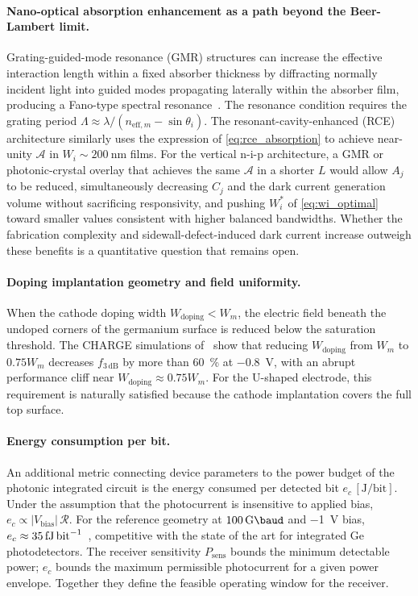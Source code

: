 \paragraph{Nano-optical absorption enhancement as a path beyond the Beer-Lambert limit.}
Grating-guided-mode resonance (GMR) structures can increase the effective
interaction length within a fixed absorber thickness by diffracting normally
incident light into guided modes propagating laterally within the absorber film,
producing a Fano-type spectral resonance~\cite{Yan2024}. The resonance condition
requires the grating period $\Lambda\approx\lambda/(n_{\mathrm{eff},m}-\sin\theta_i)$.
The resonant-cavity-enhanced (RCE) architecture similarly uses the expression of
\cref{eq:rce_absorption} to achieve near-unity $\mathcal{A}$ in
$W_i\sim\SI{200}{\nano\metre}$ films. For the vertical n-i-p architecture, a
GMR or photonic-crystal overlay that achieves the same $\mathcal{A}$ in a shorter
$L$ would allow $A_j$ to be reduced, simultaneously decreasing $C_j$ and the
dark current generation volume without sacrificing responsivity, and pushing
$W_i^*$ of \cref{eq:wi_optimal} toward smaller values consistent with higher
balanced bandwidths. Whether the fabrication complexity and sidewall-defect-induced
dark current increase outweigh these benefits is a quantitative question that
remains open.

\paragraph{Doping implantation geometry and field uniformity.}
When the cathode doping width $W_{\mathrm{doping}}<W_m$, the electric field
beneath the undoped corners of the germanium surface is reduced below the
saturation threshold. The CHARGE simulations of~\cite{Alasio2024} show that
reducing $W_{\mathrm{doping}}$ from $W_m$ to $0.75W_m$ decreases
$f_{3\,\mathrm{dB}}$ by more than \SI{60}{\percent} at \SI{-0.8}{\volt},
with an abrupt performance cliff near $W_{\mathrm{doping}}\approx0.75W_m$.
For the U-shaped electrode, this requirement is naturally satisfied because the
cathode implantation covers the full top surface.

\paragraph{Energy consumption per bit.}
An additional metric connecting device parameters to the power budget of the
photonic integrated circuit is the energy consumed per detected bit
$e_c\,[\mathrm{J/bit}]$. Under the assumption that the photocurrent is
insensitive to applied bias, $e_c\propto|V_{\mathrm{bias}}|\,\mathcal{R}$.
For the reference geometry at $\SI{100}{\giga\baud}$ and \SI{-1}{\volt} bias,
$e_c\approx\SI{35}{\femto\joule\per\bit}$~\cite{Alasio2024}, competitive with
the state of the art for integrated Ge photodetectors. The receiver sensitivity
$P_{\mathrm{sens}}$ bounds the minimum detectable power; $e_c$ bounds the
maximum permissible photocurrent for a given power envelope. Together they define
the feasible operating window for the receiver.

